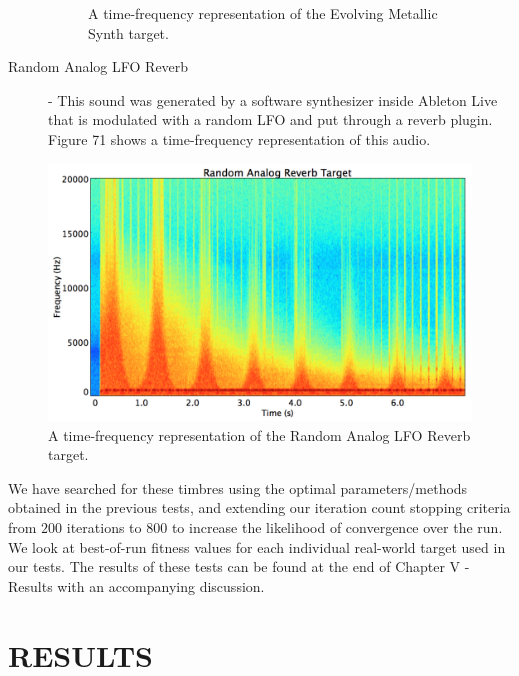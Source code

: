 \documentclass[12pt]{report} 	%
\numberwithin{figure}{chapter}
\numberwithin{table}{chapter}
\numberwithin{equation}{chapter}
\begin{document}
\begin{flushleft}
\begin{description}
\begin{figure}[h!]
\begin{center}
\caption[Evolving metallic synth time-frequency representation]{A time-frequency representation of the Evolving Metallic Synth target.}
\end{center}
\end{figure}
\item[Random Analog LFO Reverb] - This sound was generated by a software synthesizer inside Ableton Live that is modulated with a random LFO and put through a reverb plugin. Figure 71 shows a time-frequency representation of this audio.
\end{description}
\begin{figure}[h!]
\begin{center}
\includegraphics[scale=0.35,width=\linewidth]{RandomAnalogReverbTargetSTFT}
\caption[Random analog LFO reverb time-frequency representation]{A time-frequency representation of the Random Analog LFO Reverb target.}
\end{center}
\end{figure}
We have searched for these timbres using the optimal parameters/methods obtained in the previous tests, and extending our iteration count stopping criteria from $200$ iterations to $800$ to increase the likelihood of convergence over the run. We look at best-of-run fitness values for each individual real-world target used in our tests. The results of these tests can be found at the end of Chapter V - Results with an accompanying discussion.

\vspace*{\QuarterPage}
\chapter{RESULTS} %

\end{flushleft}
\end{document}
